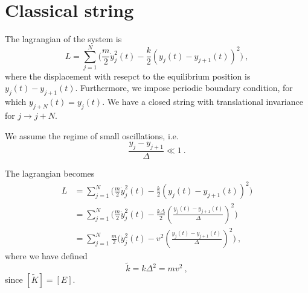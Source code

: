 \section{Classical string}

    The lagrangian of the system is 
    \begin{equation*}
        L = \sum_{j = 1}^{N} \Big ( \frac{m}{2} \dot y_j^2 (t) - \frac{k}{2} (y_j(t) - y_{j+1} (t) )^2 \Big) ~,
    \end{equation*}
    where the displacement with resepct to the equilibrium position is $y_j(t) - y_{j+1} (t)$. Furthermore, we impose periodic boundary condition, for which $y_{j + N} (t) = y_{j} (t)$. We have a closed string with translational invariance for $j \rightarrow j + N$.

    We assume the regime of small oscillations, i.e. 
    \begin{equation*}
        \frac{y_j - y_{j+1}}{\Delta} \ll 1 ~.
    \end{equation*}

    The lagrangian becomes 
    \begin{equation*}
    \begin{aligned}
        L & = \sum_{j = 1}^{N} \Big ( \frac{m}{2} \dot y_j^2 (t) - \frac{k}{2} (y_j(t) - y_{j+1} (t) )^2 \Big) \\ & = \sum_{j = 1}^{N} \Big ( \frac{m}{2} \dot y_j^2 (t) - \frac{k \Delta}{2} (\frac{y_j(t) - y_{j+1} (t) }{\Delta})^2 \Big) \\ & = \sum_{j = 1}^{N} \frac{m}{2}\Big ( \dot y_j^2 (t) - v^2 (\frac{y_j(t) - y_{j+1} (t) }{\Delta})^2 \Big) ~,
    \end{aligned}
    \end{equation*}
    where we have defined 
    \begin{equation*}
        \tilde k = k \Delta^2 = m v^2 ~,
    \end{equation*}
    since $[\tilde K] = [E]$.

